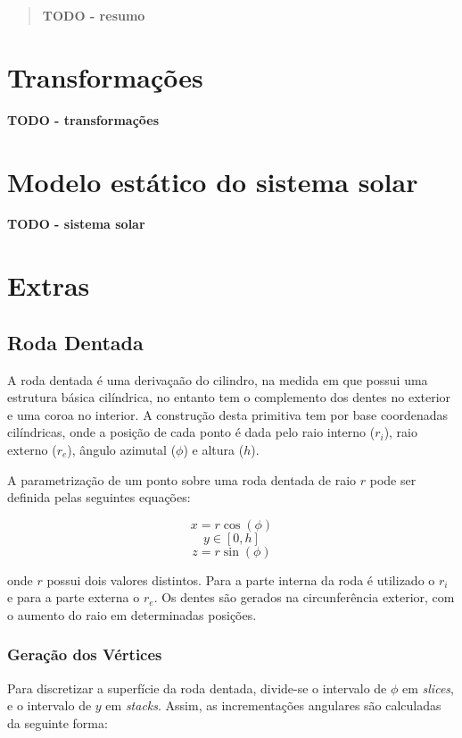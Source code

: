 \documentclass[12pt, a4paper]{article}
\begin{document}
\pagebreak

\begin{abstract}
    \textbf{\color{red} TODO - resumo}
\end{abstract}

\section{Transformações}

\textbf{\color{red} TODO - transformações}

\section{Modelo estático do sistema solar}

\textbf{\color{red} TODO - sistema solar}

\section{Extras}

\subsection{Roda Dentada}

A roda dentada é uma derivaçaão do cilindro, na medida em que possui uma estrutura básica
cilíndrica, no entanto tem o complemento dos dentes no exterior e uma coroa no interior. A
construção desta primitiva tem por base coordenadas cilíndricas, onde a posição de cada ponto é
dada pelo raio interno ($r_i$), raio externo ($r_e$), ângulo azimutal ($\phi$) e altura ($h$).

A parametrização de um ponto sobre uma roda dentada de raio \( r \) pode ser definida
pelas seguintes equações:

$$x = r \cos(\phi)$$
$$y \in \left [ 0, h \right ]$$
$$z =  r \sin(\phi)$$


onde $r$ possui dois valores distintos. Para a parte interna da roda é utilizado o $r_i$ e para a
parte externa o $r_e$. Os dentes são gerados na circunferência exterior, com o aumento do raio em
determinadas posições.

\subsubsection{Geração dos Vértices}

Para discretizar a superfície da roda dentada, divide-se o intervalo de $\phi$ em \emph{slices}, e
o intervalo de $y$ em \emph{stacks}. Assim, as incrementações angulares são calculadas da seguinte
forma:
\end{document}
